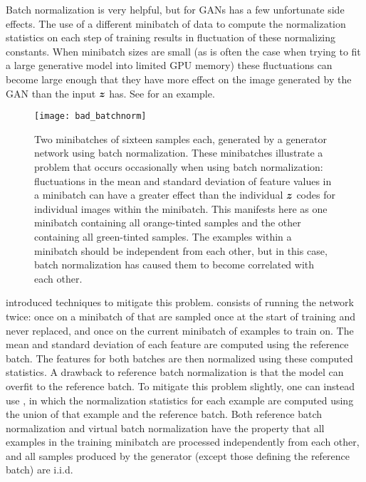 Batch normalization is very helpful, but for GANs has a few unfortunate side effects.
The use of a different minibatch of data to compute the normalization statistics
on each step of training results in fluctuation of these normalizing constants.
When minibatch sizes are small (as is often the case when trying to fit a large generative
model into limited GPU memory) these fluctuations can become large enough that they
have more effect on the image generated by the GAN than the input ${\bm{z}}$ has.
See  for an example.

\begin{figure}
\centering
\texttt{[image: bad\_batchnorm]}
\caption{
Two minibatches of sixteen samples each, generated by a generator network using
batch normalization.
These minibatches illustrate a problem that occurs occasionally when using batch
normalization: fluctuations in the mean and standard deviation of feature values
in a minibatch can have a greater effect than the individual ${\bm{z}}$ codes for individual
images within the minibatch.
This manifests here as one minibatch containing all orange-tinted samples and the other
containing all green-tinted samples.
The examples within a minibatch should be independent from each other, but in this
case, batch normalization has caused them to become correlated with each other.
}
\label{fig:bad_batchnorm}
\end{figure}

\citet{salimans2016improved} introduced techniques to mitigate this problem.
 consists of running the network twice:
once on a minibatch of  that are sampled once at the
start of training and never replaced, and once on the current minibatch of examples
to train on.
The mean and standard deviation of each feature are computed using the reference
batch. The features for both batches are then normalized using these computed statistics.
A drawback to reference batch normalization is that the model can overfit to the
reference batch. To mitigate this problem slightly, one can instead use
, in which the normalization statistics for each
example are computed using the union of that example and the reference batch.
Both reference batch normalization and virtual batch normalization have the property
that all examples in the training minibatch are processed independently from each other,
and all samples produced by the generator (except those defining the reference batch)
are i.i.d.


